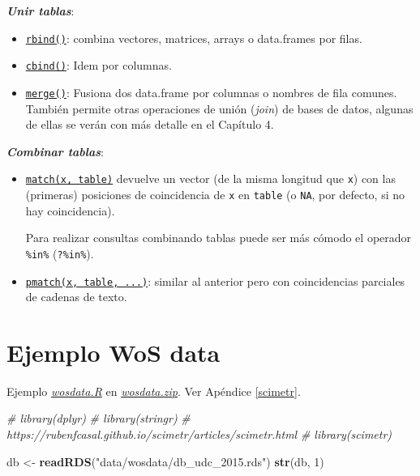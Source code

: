 \documentclass[
]{book}
\newenvironment{Shaded}{\begin{snugshade}}{\end{snugshade}}
\newcommand{\CommentTok}[1]{\textcolor[rgb]{0.56,0.35,0.01}{\textit{#1}}}
\newcommand{\DecValTok}[1]{\textcolor[rgb]{0.00,0.00,0.81}{#1}}
\newcommand{\FunctionTok}[1]{\textcolor[rgb]{0.13,0.29,0.53}{\textbf{#1}}}
\newcommand{\NormalTok}[1]{#1}
\newcommand{\OtherTok}[1]{\textcolor[rgb]{0.56,0.35,0.01}{#1}}
\newcommand{\StringTok}[1]{\textcolor[rgb]{0.31,0.60,0.02}{#1}}
\begin{document}
\textbf{\emph{Unir tablas}}:

\begin{itemize}
\item
  \href{https://www.rdocumentation.org/packages/base/versions/3.6.1/topics/rbind}{\texttt{rbind()}}: combina vectores, matrices, arrays o data.frames por filas.
\item
  \href{https://www.rdocumentation.org/packages/base/versions/3.6.1/topics/cbind}{\texttt{cbind()}}: Idem por columnas.
\item
  \href{https://www.rdocumentation.org/packages/base/versions/3.6.1/topics/merge}{\texttt{merge()}}: Fusiona dos data.frame por columnas o nombres de fila comunes. También permite otras operaciones de unión (\emph{join}) de bases de datos, algunas de ellas se verán con más detalle en el Capítulo 4.
\end{itemize}

\textbf{\emph{Combinar tablas}}:

\begin{itemize}
\item
  \href{https://www.rdocumentation.org/packages/base/versions/3.6.1/topics/match}{\texttt{match(x,\ table)}} devuelve un vector (de la misma longitud que \texttt{x}) con las (primeras) posiciones de coincidencia de \texttt{x} en \texttt{table} (o \texttt{NA}, por defecto, si no hay coincidencia).

  Para realizar consultas combinando tablas puede ser más cómodo el operador \texttt{\%in\%} (\texttt{?\textquotesingle{}\%in\%\textquotesingle{}}).
\item
  \href{https://www.rdocumentation.org/packages/base/versions/3.6.1/topics/pmatch}{\texttt{pmatch(x,\ table,\ ...)}}: similar al anterior pero con coincidencias parciales de cadenas de texto.
\end{itemize}

\section{Ejemplo WoS data}\label{ejemplo-wos-data}

Ejemplo \href{data/wosdata.R}{\emph{wosdata.R}} en \href{data/wosdata.zip}{\emph{wosdata.zip}}.
Ver Apéndice \ref{scimetr}.

\begin{Shaded}
\begin{Highlighting}[]
\CommentTok{\# library(dplyr)}
\CommentTok{\# library(stringr)}
\CommentTok{\# https://rubenfcasal.github.io/scimetr/articles/scimetr.html}
\CommentTok{\# library(scimetr)}

\NormalTok{db }\OtherTok{\textless{}{-}} \FunctionTok{readRDS}\NormalTok{(}\StringTok{"data/wosdata/db\_udc\_2015.rds"}\NormalTok{)}
\FunctionTok{str}\NormalTok{(db, }\DecValTok{1}\NormalTok{)}
\end{Highlighting}
\end{Shaded}
\end{document}
